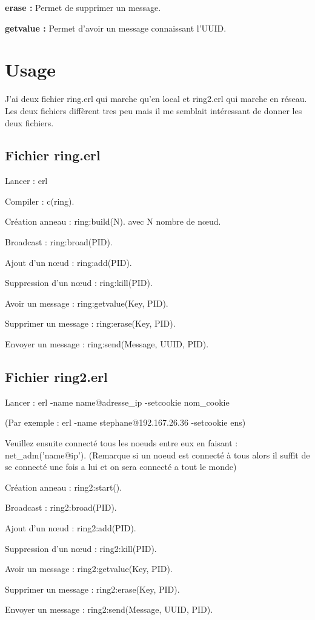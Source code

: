 \documentclass[12pt,a4paper]{article}
\begin{document}
\textbf{erase : } Permet de supprimer un message.

\textbf{getvalue : } Permet d'avoir un message connaissant l'UUID.

\section{Usage}

J'ai deux fichier ring.erl qui marche qu'en local et ring2.erl qui marche en réseau. Les deux fichiers diffèrent tres peu mais il me semblait intéressant de donner les deux fichiers.
\subsection{Fichier ring.erl}
Lancer : erl

Compiler : c(ring).

Création anneau : ring:build(N). avec N nombre de nœud.

Broadcast : ring:broad(PID).

Ajout d'un nœud : ring:add(PID).

Suppression d'un nœud : ring:kill(PID).

Avoir un message : ring:getvalue(Key, PID).

Supprimer un message : ring:erase(Key, PID).

Envoyer un message : ring:send(Message, UUID, PID).

\subsection{Fichier ring2.erl}

Lancer : erl -name name@adresse\_ip -setcookie nom\_cookie

(Par exemple : erl -name stephane@192.167.26.36 -setcookie ens)

Veuillez ensuite connecté tous les noeuds entre eux en faisant : net\_adm('name@ip'). (Remarque si un noeud est connecté à tous alors il suffit de se connecté une fois a lui et on sera connecté a tout le monde)

Création anneau : ring2:start().

Broadcast : ring2:broad(PID).

Ajout d'un nœud : ring2:add(PID).

Suppression d'un nœud : ring2:kill(PID).

Avoir un message : ring2:getvalue(Key, PID).

Supprimer un message : ring2:erase(Key, PID).

Envoyer un message : ring2:send(Message, UUID, PID).
\end{document}
